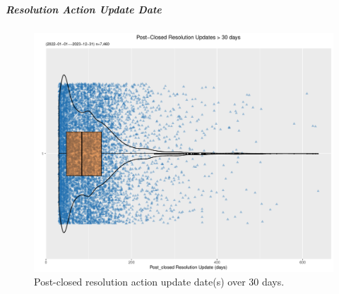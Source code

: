 \documentclass[linenumber]{jdsart}
\begin{document}
    

		

		

\subparagraph{Resolution Action Update Date}
	
\begin{figure}[tbp]
  \centering
  \includegraphics[width=\textwidth]{post_closed_violin_chart.pdf}
  \caption{Post-closed resolution action update date(s) over 30 days.}
  \label{fig:resolution-violin}
\end{figure}
\end{document}
